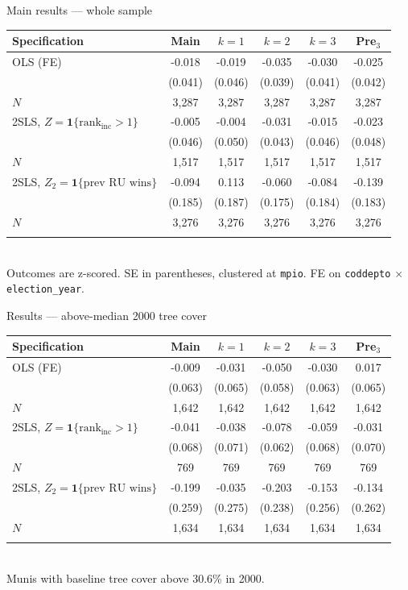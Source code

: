 \documentclass[10pt,aspectratio=169]{beamer}
\begin{document}
\begin{frame}{Main results — whole sample}
\centering
\renewcommand{\arraystretch}{1.15}\footnotesize
\begin{tabular}{lccccc}
\toprule
Specification & Main & $k{=}1$ & $k{=}2$ & $k{=}3$ & Pre$_3$ \\
\midrule
OLS (FE) & -0.018 & -0.019 & -0.035 & -0.030 & -0.025 \\
 & (0.041) & (0.046) & (0.039) & (0.041) & (0.042) \\
$N$ & 3,287 & 3,287 & 3,287 & 3,287 & 3,287 \\
\addlinespace[2pt]
2SLS, $Z=\mathbf{1}\{\text{rank}_\text{inc}{>}1\}$ & -0.005 & -0.004 & -0.031 & -0.015 & -0.023 \\
 & (0.046) & (0.050) & (0.043) & (0.046) & (0.048) \\
$N$ & 1,517 & 1,517 & 1,517 & 1,517 & 1,517 \\
\addlinespace[2pt]
2SLS, $Z_2=\mathbf{1}\{\text{prev RU wins}\}$ & -0.094 & 0.113 & -0.060 & -0.084 & -0.139 \\
 & (0.185) & (0.187) & (0.175) & (0.184) & (0.183) \\
$N$ & 3,276 & 3,276 & 3,276 & 3,276 & 3,276 \\
\addlinespace[2pt]
\bottomrule
\end{tabular}
\\[0.3em]
\footnotesize Outcomes are z-scored. SE in parentheses, clustered at
\texttt{mpio}. FE on \texttt{coddepto} $\times$ \texttt{election\_year}.
\end{frame}


\begin{frame}{Results — above-median 2000 tree cover}
\centering
\renewcommand{\arraystretch}{1.15}\footnotesize
\begin{tabular}{lccccc}
\toprule
Specification & Main & $k{=}1$ & $k{=}2$ & $k{=}3$ & Pre$_3$ \\
\midrule
OLS (FE) & -0.009 & -0.031 & -0.050 & -0.030 & 0.017 \\
 & (0.063) & (0.065) & (0.058) & (0.063) & (0.065) \\
$N$ & 1,642 & 1,642 & 1,642 & 1,642 & 1,642 \\
\addlinespace[2pt]
2SLS, $Z=\mathbf{1}\{\text{rank}_\text{inc}{>}1\}$ & -0.041 & -0.038 & -0.078 & -0.059 & -0.031 \\
 & (0.068) & (0.071) & (0.062) & (0.068) & (0.070) \\
$N$ & 769 & 769 & 769 & 769 & 769 \\
\addlinespace[2pt]
2SLS, $Z_2=\mathbf{1}\{\text{prev RU wins}\}$ & -0.199 & -0.035 & -0.203 & -0.153 & -0.134 \\
 & (0.259) & (0.275) & (0.238) & (0.256) & (0.262) \\
$N$ & 1,634 & 1,634 & 1,634 & 1,634 & 1,634 \\
\addlinespace[2pt]
\bottomrule
\end{tabular}
\\[0.3em]
\footnotesize Munis with baseline tree cover above 30.6\% in 2000.
\end{frame}
\end{document}

